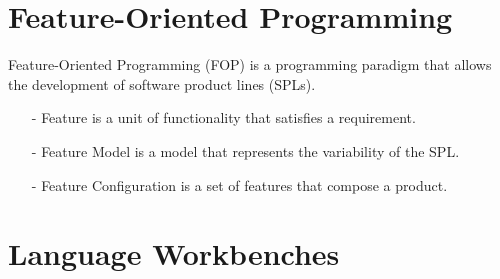 \documentclass[9pt,xcolor=table,svgnames]{beamer}
\begin{document}

\section[FOP]{Feature-Oriented Programming}

\begin{frame}{\secname}

    \alert{Feature-Oriented Programming} (FOP) is a programming paradigm that allows the development of \alert{software product lines} (SPLs).

    \pause

    \bigskip
    \begin{itemize}
        \item[\alert{-}] \alert{Feature} is a unit of functionality that satisfies a requirement.
        \item[\alert{-}] \alert{Feature Model} is a model that represents the variability of the SPL.
        \item[\alert{-}] \alert{Feature Configuration} is a set of features that compose a product.
    \end{itemize}
\end{frame}



\section[LWs]{Language Workbenches}
\end{document}
